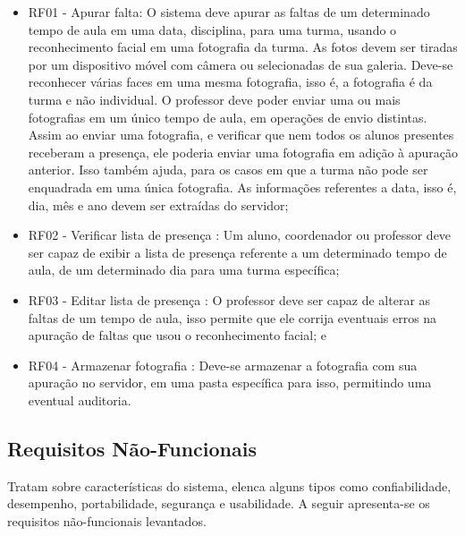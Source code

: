 \begin{itemize}
\item RF01 - Apurar falta: O sistema deve apurar as faltas de um determinado tempo de aula em uma data, disciplina, para uma turma, usando o reconhecimento facial em uma fotografia da turma. As fotos devem ser tiradas por um dispositivo móvel com câmera ou selecionadas de sua galeria. Deve-se reconhecer várias faces em uma mesma fotografia, isso é, a fotografia é da turma e não individual. O professor deve poder enviar uma ou mais fotografias em um único tempo de aula, em operações de envio distintas. Assim ao enviar uma fotografia, e verificar que nem todos os alunos presentes receberam a presença, ele poderia enviar uma fotografia em adição à apuração anterior. Isso também ajuda, para os casos em que a turma não pode ser enquadrada em uma única fotografia. As informações referentes a data, isso é, dia, mês e ano devem ser extraídas do servidor; 

\item RF02 - Verificar lista de presença : Um aluno, coordenador ou professor deve ser capaz de  exibir a lista de presença referente a um determinado tempo de aula, de um determinado dia para uma turma específica; 
\item RF03 - Editar lista de presença : O professor deve ser capaz de alterar as faltas de um tempo de aula, isso permite que ele corrija eventuais erros na apuração de faltas que usou o reconhecimento facial; e 
\item RF04 - Armazenar fotografia : Deve-se armazenar a fotografia com sua apuração no servidor, em uma pasta específica para isso, permitindo uma eventual auditoria.
\end{itemize}

\subsection{Requisitos Não-Funcionais}
Tratam sobre características do sistema, \citep{bezerra} elenca alguns tipos como confiabilidade, desempenho, portabilidade, segurança e usabilidade. A seguir apresenta-se os requisitos não-funcionais levantados.

